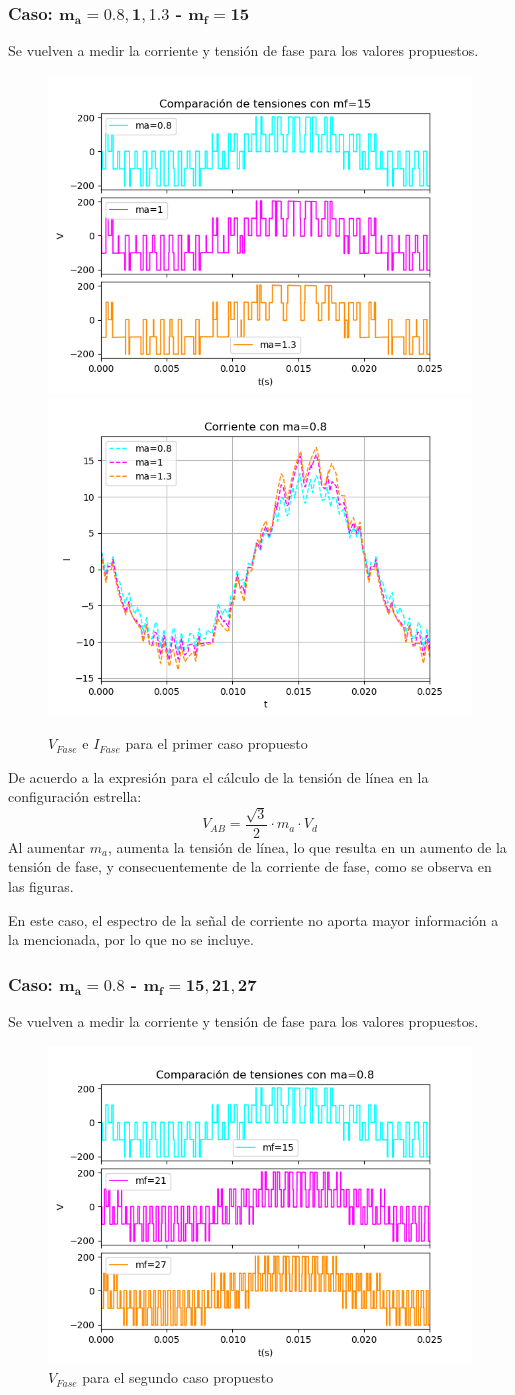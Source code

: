 \documentclass[e4_tp3_main.tex]{subfiles}
\begin{document}
\subsubsection{Caso: $\mathbf{m_a = 0.8,1,1.3}$ - $\mathbf{m_f = 15}$}
Se vuelven a medir la corriente y tensión de fase para los valores propuestos.
\begin{figure}[H]
\centering
\includegraphics[width=0.49\linewidth]{Imagenes/Ej2b_V.png}
\includegraphics[width=0.49\linewidth]{Imagenes/Ej2b_I.png}
\caption{$V_{Fase}$ e $I_{Fase}$ para el primer caso propuesto}
\end{figure}

De acuerdo a la expresión para el cálculo de la tensión de línea en la configuración estrella:
\[
V_{AB} = \frac{\sqrt{3}}{2} \cdot m_a \cdot V_d
\]
Al aumentar $m_a$, aumenta la tensión de línea, lo que resulta en un aumento de la tensión de fase, y consecuentemente de la corriente de fase, como se observa en las figuras.\par
En este caso, el espectro de la señal de corriente no aporta mayor información a la mencionada, por lo que no se incluye.

\subsubsection{Caso: $\mathbf{m_a = 0.8}$ - $\mathbf{m_f = 15,21,27}$}
Se vuelven a medir la corriente y tensión de fase para los valores propuestos.
\begin{figure}[H]
\centering
\includegraphics[width=0.48\linewidth]{Imagenes/Ej2c_V.png}
\caption{$V_{Fase}$ para el segundo caso propuesto}
\end{figure}
\end{document}
